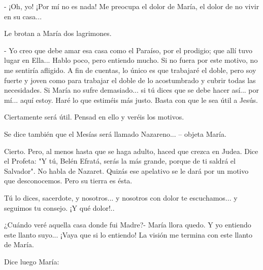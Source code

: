 \documentclass[12pt]{book} %
\begin{document}
- ¡Oh, yo! ¡Por mí no es nada! Me preocupa el dolor de María, el dolor de no vivir en su casa... 

Le brotan a María dos lagrimones. 

- Yo creo que debe amar esa casa como el Paraíso, por el prodigio; que allí tuvo lugar en Ella... Hablo poco, pero entiendo mucho. Si no fuera por este motivo, no me sentiría afligido. A fin de cuentas, lo único es que trabajaré el doble, pero soy fuerte y joven como para trabajar el doble de lo acostumbrado y cubrir todas las necesidades. Si María no sufre demasiado... si tú dices que se debe hacer así... por mí... aquí estoy. Haré lo que estiméis más justo. Basta con que le sea útil a Jesús. 

Ciertamente será útil. Pensad en ello y veréis los motivos. 

Se dice también que el Mesías será llamado Nazareno... – objeta María. 

Cierto. Pero, al menos hasta que se haga adulto, haced que crezca en Judea. Dice el Profeta: "Y tú, Belén Efratá, serás la más grande, porque de ti saldrá el Salvador". No habla de Nazaret. Quizás ese apelativo se le dará por un motivo que desconocemos. Pero su tierra es ésta. 

Tú lo dices, sacerdote, y nosotros... y nosotros con dolor te escuchamos... y seguimos tu consejo. ¡Y qué dolor!.. 

¿Cuándo veré aquella casa donde fui Madre?- María llora quedo. Y yo entiendo este llanto suyo... ¡Vaya que si lo entiendo! La visión me termina con este llanto de María. 

Dice luego María: 
\end{document}
